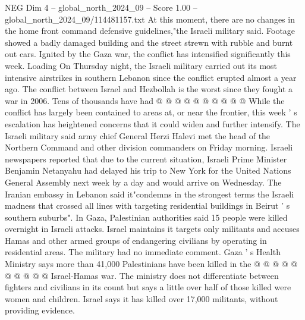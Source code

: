 \begin{textsample}{NEG Dim 4 – global\_north\_2024\_09 – Score 1.00 – global\_north\_2024\_09/114481157.txt}
At this moment, there are no changes in the home front command defensive guidelines,"the Israeli military said.
Footage showed a badly damaged building and the street strewn with rubble and burnt out cars.
Ignited by the Gaza war, the conflict has intensified significantly this week.
Loading On Thursday night, the Israeli military carried out its most intensive airstrikes in southern Lebanon since the conflict erupted almost a year ago.
The conflict between Israel and Hezbollah is the worst since they fought a war in 2006.
Tens of thousands have had @ @ @ @ @ @ @ @ @ @ While the conflict has largely been contained to areas at, or near the frontier, this week ' s escalation has heightened concerns that it could widen and further intensify.
The Israeli military said army chief General Herzi Halevi met the head of the Northern Command and other division commanders on Friday morning.
Israeli newspapers reported that due to the current situation, Israeli Prime Minister Benjamin Netanyahu had delayed his trip to New York for the United Nations General Assembly next week by a day and would arrive on Wednesday.
The Iranian embassy in Lebanon said it"condemns in the strongest terms the Israeli madness that crossed all lines with targeting residential buildings in Beirut ' s southern suburbs".
In Gaza, Palestinian authorities said 15 people were killed overnight in Israeli attacks.
Israel maintains it targets only militants and accuses Hamas and other armed groups of endangering civilians by operating in residential areas.
The military had no immediate comment.
Gaza ' s Health Ministry says more than 41,000 Palestinians have been killed in the @ @ @ @ @ @ @ @ @ @ Israel-Hamas war.
The ministry does not differentiate between fighters and civilians in its count but says a little over half of those killed were women and children.
Israel says it has killed over 17,000 militants, without providing evidence.

\end{textsample}
